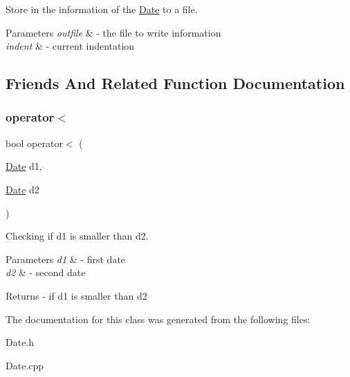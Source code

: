 Store in the information of the \mbox{\hyperlink{class_date}{Date}} to a file. 


\begin{DoxyParams}{Parameters}
{\em outfile} & -\/ the file to write information \\
\hline
{\em indent} & -\/ current indentation \\
\hline
\end{DoxyParams}


\subsection{Friends And Related Function Documentation}
\mbox{\label{class_date_ab238dfc73280d2b16266ebd3daf1b896}} 
\subsubsection{\texorpdfstring{operator$<$}{operator<}}
{\footnotesize\ttfamily bool operator$<$ (\begin{DoxyParamCaption}\item[{\mbox{\hyperlink{class_date}{Date}}}]{d1,  }\item[{\mbox{\hyperlink{class_date}{Date}}}]{d2 }\end{DoxyParamCaption})\hspace{0.3cm}{\ttfamily [friend]}}



Checking if d1 is smaller than d2. 


\begin{DoxyParams}{Parameters}
{\em d1} & -\/ first date \\
\hline
{\em d2} & -\/ second date \\
\hline
\end{DoxyParams}
\begin{DoxyReturn}{Returns}
-\/ if d1 is smaller than d2 
\end{DoxyReturn}


The documentation for this class was generated from the following files\+:\begin{DoxyCompactItemize}
\item 
Date.\+h\item 
Date.\+cpp\end{DoxyCompactItemize}
